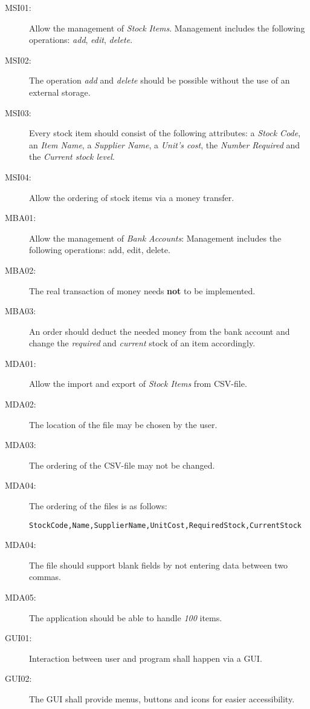 \begin{description}
\item[MSI01:] Allow the management of \textit{Stock Items}. Management includes the following operations: \textit{add}, \textit{edit}, \textit{delete}.
\item[MSI02:] The operation \textit{add} and \textit{delete} should be possible without the use of an external storage.
\item[MSI03:] Every stock item should consist of the following attributes: a \textit{Stock Code}, an \textit{Item Name}, a \textit{Supplier Name}, a \textit{Unit's cost}, the \textit{Number Required} and the \textit{Current stock level}.
\item[MSI04:] Allow the ordering of stock items via a money transfer.
\item[MBA01:] Allow the management of \textit{Bank Accounts}: Management includes the following operations: add, edit, delete.
\item[MBA02:] The real transaction of money needs \textbf{not} to be implemented.
\item[MBA03:] An order should deduct the needed money from the bank account and change the \textit{required} and \textit{current} stock of an item accordingly.
\item[MDA01:] Allow the import and export of \textit{Stock Items} from \ac{CSV}-file.
\item[MDA02:] The location of the file may be chosen by the user.
\item[MDA03:] The ordering of the \ac{CSV}-file may not be changed.
\item[MDA04:] The ordering of the files is as follows:
\begin{lstlisting}
StockCode,Name,SupplierName,UnitCost,RequiredStock,CurrentStock
\end{lstlisting}
\item[MDA04:] The file should support blank fields by not entering data between two commas.
\item[MDA05:] The application should be able to handle \textit{100} items.
\item[GUI01:] Interaction between user and program shall happen via a \ac{GUI}.
\item[GUI02:] The \ac{GUI} shall provide menus, buttons and icons for easier accessibility.
\end{description}
